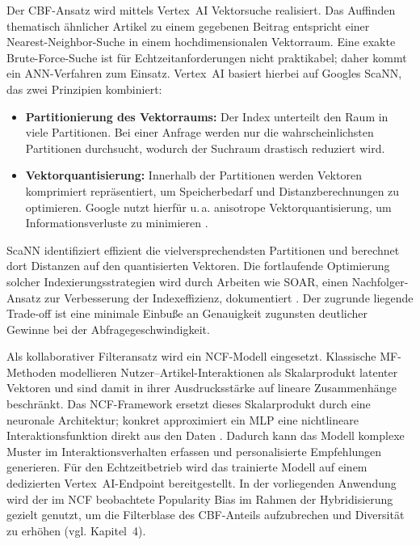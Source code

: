 \label{sec:cbf_service}
Der \ac{CBF}-Ansatz wird mittels Vertex~AI Vektorsuche realisiert. Das Auffinden thematisch ähnlicher Artikel zu einem gegebenen Beitrag entspricht einer Nearest-Neighbor-Suche in einem hochdimensionalen Vektorraum. Eine exakte Brute-Force-Suche ist für Echtzeitanforderungen nicht praktikabel; daher kommt ein \ac{ANN}-Verfahren zum Einsatz. Vertex~AI basiert hierbei auf Googles \ac{ScaNN}, das zwei Prinzipien kombiniert:
\begin{itemize}
    \item \textbf{Partitionierung des Vektorraums:} Der Index unterteilt den Raum in viele Partitionen. Bei einer Anfrage werden nur die wahrscheinlichsten Partitionen durchsucht, wodurch der Suchraum drastisch reduziert wird.
    \item \textbf{Vektorquantisierung:} Innerhalb der Partitionen werden Vektoren komprimiert repräsentiert, um Speicherbedarf und Distanzberechnungen zu optimieren. Google nutzt hierfür u.\,a. anisotrope Vektorquantisierung, um Informationsverluste zu minimieren \cite{avq_2020}.
\end{itemize}
ScaNN identifiziert effizient die vielversprechendsten Partitionen und berechnet dort Distanzen auf den quantisierten Vektoren. Die fortlaufende Optimierung solcher Indexierungsstrategien wird durch Arbeiten wie SOAR, einen Nachfolger-Ansatz zur Verbesserung der Indexeffizienz, dokumentiert \cite{soar_2023}. Der zugrunde liegende Trade-off ist eine minimale Einbuße an Genauigkeit zugunsten deutlicher Gewinne bei der Abfragegeschwindigkeit.

\label{sec:ncf_service}
Als kollaborativer Filteransatz wird ein \ac{NCF}-Modell eingesetzt. Klassische \ac{MF}-Methoden modellieren Nutzer–Artikel-Interaktionen als Skalarprodukt latenter Vektoren und sind damit in ihrer Ausdrucksstärke auf lineare Zusammenhänge beschränkt. Das NCF-Framework ersetzt dieses Skalarprodukt durch eine neuronale Architektur; konkret approximiert ein \ac{MLP} eine nichtlineare Interaktionsfunktion direkt aus den Daten \cite{he_neural_2017}. Dadurch kann das Modell komplexe Muster im Interaktionsverhalten erfassen und personalisierte Empfehlungen generieren. Für den Echtzeitbetrieb wird das trainierte Modell auf einem dedizierten Vertex~AI-Endpoint bereitgestellt. In der vorliegenden Anwendung wird der im NCF beobachtete Popularity Bias im Rahmen der Hybridisierung gezielt genutzt, um die Filterblase des CBF-Anteils aufzubrechen und Diversität zu erhöhen (vgl. Kapitel~4).

